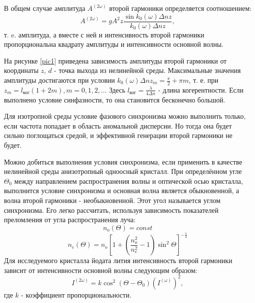\documentclass[12pt]{article}
\begin{document}
\hspace{0.5cm}
В общем случае амплитуда $A^{(2\omega)}$ второй гармоники определяется соотношением:
\begin{equation}
\label{inten}
A^{(2\omega)} = gA^2z\frac{\sin{k_0(\omega)\Delta nz}}{k_0(\omega)\Delta nz},
\end{equation}
т. e. амплитуда, а вместе с ней и интенсивность второй гармоники пропорциональна квадрату амплитуды и интенсивности основной волны.
\hspace{0.5cm}

На рисунке \ref{pic1} приведена зависимость амплитуды второй гармоники от координаты $z$, $d$ - точка выхода из нелинейной среды.
Максимальные значения амплитуды достигаются при условии $k_0(\omega)\Delta nz_m=\frac{\pi}{2}+\pi m$, т. е. при $z_m = l_{\text{ког}}(1+2m), m = 0,1,2,...$ Здесь $l_{\text{ког}}=\frac{\lambda}{4\Delta n}$ - длина когерентности. Если выполнено условие синфазности, то она становится бесконечно большой.
\hspace{0.5cm}

Для изотропной среды условие фазового синхронизма можно выполнить только, если частота попадает в область аномальной дисперсии. Но тогда она будет сильно поглощаться средой, и эффективной генерации второй гармоники не будет.
\hspace{0.5cm}

Можно добиться выполнения условия синхронизма, если применить в качестве нелинейной среды анизотропный одноосный кристалл. При определённом угле $\Theta_0$ между направлением распространения волны и оптической осью кристалла, выполнится условие синхронизма и основная волна является обыкновенной, а волна второй гармоники - необыкновенной. Этот угол называется углом синхронизма. Его легко рассчитать, используя зависимость показателей преломления от угла распространения луча:
\begin{equation}
n_o(\Theta) = const
\end{equation}
\begin{equation}
n_e(\Theta) = n_o\left[1+\left(\frac{n_o^2}{n_e^2}-1\right)\sin^2{\Theta}\right]^{-\frac{1}{2}}
\end{equation}
\hspace{0.5cm}
Для исследуемого кристалла йодата лития интенсивность второй гармоники зависит от интенсивности основной волны следующим образом:
\begin{equation}
\label{finaleq}
I^{(2\omega)} = k\cos^2{(\Theta-\Theta_0)}(I^{(\omega)})^2,
\end{equation}
где $k$ - коэффициент пропорциональности.
\end{document}
